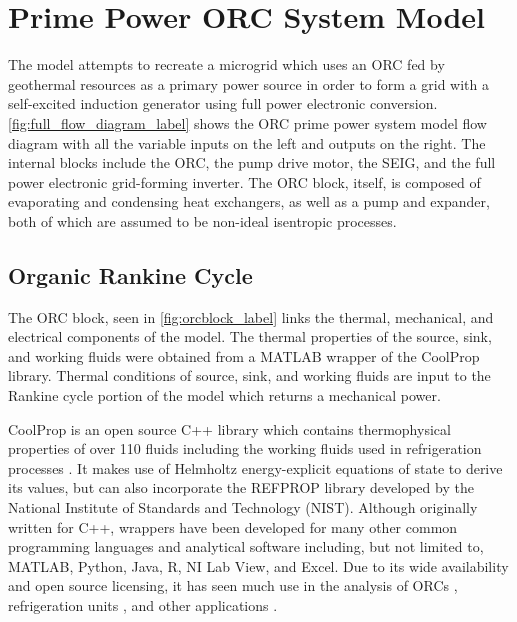 \chapter{Prime Power ORC System Model}
\label{ch:model}

The model attempts to recreate a microgrid which uses an ORC fed by geothermal resources as a primary power source in order to form a grid with a self-excited induction generator using full power electronic conversion. \autoref{fig:full_flow_diagram_label} shows the ORC prime power system model flow diagram with all the variable inputs on the left and outputs on the right. The internal blocks include the ORC, the pump drive motor, the SEIG, and the full power electronic grid-forming inverter. The ORC block, itself, is composed of evaporating and condensing heat exchangers, as well as a pump and expander, both of which are assumed to be non-ideal isentropic processes.


\section{Organic Rankine Cycle}
The ORC block, seen in \autoref{fig:orcblock_label} links the thermal, mechanical, and electrical components of the model. The thermal properties of the source, sink, and working fluids were obtained from a MATLAB\textsuperscript{\textregistered} wrapper of the CoolProp\textsuperscript{\textcopyright} library. Thermal conditions of source, sink, and working fluids are input to the Rankine cycle portion of the model which returns a mechanical power. 


CoolProp\textsuperscript{\textcopyright} is an open source C++ library which contains thermophysical properties of over 110 fluids including the working fluids used in refrigeration processes \cite{Bell2014}. It makes use of Helmholtz energy-explicit equations of state to derive its values, but can also incorporate the REFPROP library developed by the National Institute of Standards and Technology (NIST). Although originally written for C++, wrappers have been developed for many other common programming languages and analytical software including, but not limited to, MATLAB\textsuperscript{\textregistered}, Python, Java, R, NI Lab View\textsuperscript{\texttrademark}, and Excel. Due to its wide availability and open source licensing, it has seen much use in the analysis of ORCs \cite{Pezzuolo2016, Pierobon2014}, refrigeration units \cite{Besagni2015}, and other applications \cite{Quoilin2014, Nilsen2016}.

